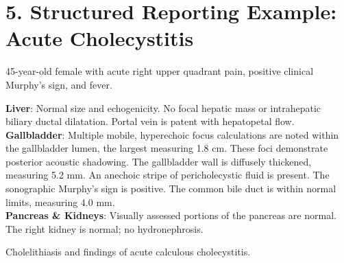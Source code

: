 \section*{5. Structured Reporting Example: Acute Cholecystitis}

\begin{testbox}[Indications:]
45-year-old female with acute right upper quadrant pain, positive clinical Murphy's sign, and fever.
\end{testbox}
\begin{refbox}[Findings:]
\textbf{Liver}: Normal size and echogenicity. No focal hepatic mass or intrahepatic biliary ductal dilatation. Portal vein is patent with hepatopetal flow.\\
\textbf{Gallbladder}: Multiple mobile, hyperechoic focus calculations are noted within the gallbladder lumen, the largest measuring 1.8 cm. These foci demonstrate posterior acoustic shadowing. The gallbladder wall is diffusely thickened, measuring 5.2 mm. An anechoic stripe of pericholecystic fluid is present. The sonographic Murphy's sign is positive. The common bile duct is within normal limits, measuring 4.0 mm.\\
\textbf{Pancreas \& Kidneys}: Visually assessed portions of the pancreas are normal. The right kidney is normal; no hydronephrosis.
\end{refbox}
\begin{pearlbox}[Impression:]
Cholelithiasis and findings of acute calculous cholecystitis.
\end{pearlbox}

\clearpage
